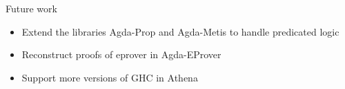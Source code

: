 \begin{frame}{Future work}

  \begin{itemize}
  \item
    Extend the libraries Agda-Prop and Agda-Metis to handle predicated logic
  \item
    Reconstruct proofs of eprover in Agda-EProver
  \item
    Support more versions of GHC in Athena
  \end{itemize}

\end{frame}
